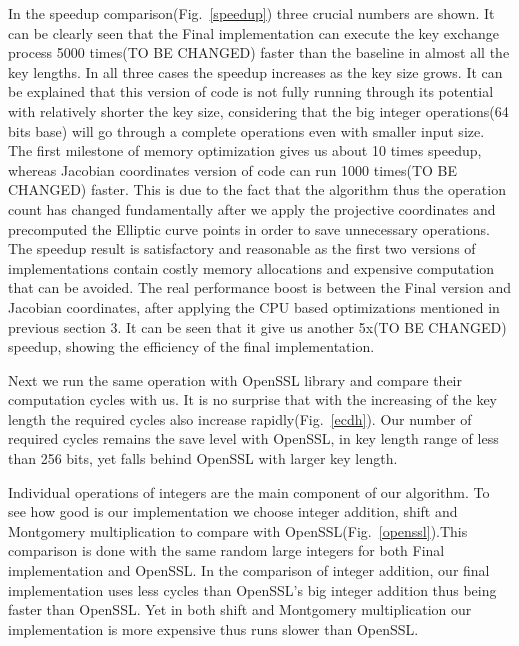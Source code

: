 In the speedup comparison(Fig.~\ref{speedup}) three crucial numbers are shown. It can be clearly seen that the Final implementation can execute the key exchange process 5000 times(TO BE CHANGED) faster than the baseline in almost all the key lengths. In all three cases the speedup increases as the key size grows. It can be explained that this version of code is not fully running through its potential with relatively shorter the key size, considering that the big integer operations(64 bits base) will go through a complete operations even with smaller input size. The first milestone of memory optimization gives us about 10 times speedup, whereas Jacobian coordinates version of code can run 1000 times(TO BE CHANGED) faster. This is due to the fact that the algorithm thus the operation count has changed fundamentally after we apply the projective coordinates and precomputed the Elliptic curve points in order to save unnecessary operations. The speedup result is satisfactory and reasonable as the first two versions of implementations contain costly memory allocations and expensive computation that can be avoided. The real performance boost is between the Final version and Jacobian coordinates, after applying the CPU based optimizations mentioned in previous section 3. It can be seen that it give us another 5x(TO BE CHANGED) speedup, showing the efficiency of the final implementation.



Next we run the same operation with OpenSSL library and compare their computation cycles with us. It is no surprise that with the increasing of the key length the required cycles also increase rapidly(Fig.~\ref{ecdh}). Our number of required cycles remains the save level with OpenSSL, in key length range of less than 256 bits, yet falls behind OpenSSL with larger key length. 



Individual operations of integers are the main component of our algorithm. To see how good is our implementation we choose integer addition, shift and Montgomery multiplication to compare with OpenSSL(Fig.~\ref{openssl}).This comparison is done with the same random large integers for both Final implementation and OpenSSL. In the comparison of integer addition, our final implementation uses less cycles than OpenSSL's big integer addition thus being faster than OpenSSL. Yet in both shift and Montgomery multiplication our implementation is more expensive thus runs slower than OpenSSL. 


